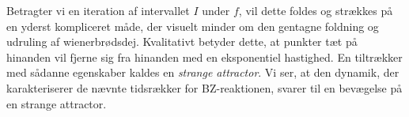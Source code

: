 \vspace{4.0mm}
Betragter vi en iteration af intervallet $I$ under $f$, vil
dette foldes og str{\ae}kkes p{\aa} en yderst kompliceret
m{\aa}de, der visuelt minder om den gentagne foldning og
udruling af wienerbr{\o}dsdej. Kvalitativt betyder dette,
at punkter t{\ae}t p{\aa} hinanden vil fjerne sig fra
hinanden med en eksponentiel hastighed. En tiltr{\ae}kker med
s{\aa}danne egenskaber kaldes en {\em strange attractor\/}.
Vi ser, at den dynamik, der karakteriserer de n{\ae}vnte
tidsr{\ae}kker for BZ-reaktionen, svarer til en
bev{\ae}gelse p{\aa} en strange attractor.



